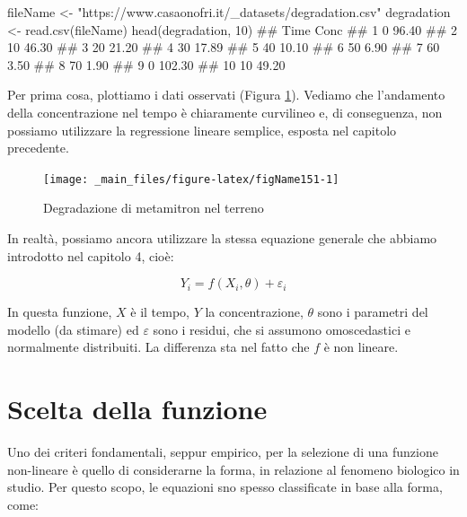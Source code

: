 \documentclass[a4paper,12pt,oneside]{book}
\newenvironment{Shaded}{\begin{snugshade}}{\end{snugshade}}
\newcommand{\DecValTok}[1]{#1}
\newcommand{\StringTok}[1]{#1}
\newcommand{\DocumentationTok}[1]{#1}
\newcommand{\OtherTok}[1]{#1}
\newcommand{\FunctionTok}[1]{#1}
\newcommand{\NormalTok}[1]{#1}
\begin{document}
\begin{Shaded}
\begin{Highlighting}[]
\NormalTok{fileName }\OtherTok{\textless{}{-}} \StringTok{"https://www.casaonofri.it/\_datasets/degradation.csv"}
\NormalTok{degradation }\OtherTok{\textless{}{-}} \FunctionTok{read.csv}\NormalTok{(fileName)}
\FunctionTok{head}\NormalTok{(degradation, }\DecValTok{10}\NormalTok{)}
\DocumentationTok{\#\#    Time   Conc}
\DocumentationTok{\#\# 1     0  96.40}
\DocumentationTok{\#\# 2    10  46.30}
\DocumentationTok{\#\# 3    20  21.20}
\DocumentationTok{\#\# 4    30  17.89}
\DocumentationTok{\#\# 5    40  10.10}
\DocumentationTok{\#\# 6    50   6.90}
\DocumentationTok{\#\# 7    60   3.50}
\DocumentationTok{\#\# 8    70   1.90}
\DocumentationTok{\#\# 9     0 102.30}
\DocumentationTok{\#\# 10   10  49.20}
\end{Highlighting}
\end{Shaded}

Per prima cosa, plottiamo i dati osservati (Figura \ref{fig:figName151}). Vediamo che l'andamento della concentrazione nel tempo è chiaramente curvilineo e, di conseguenza, non possiamo utilizzare la regressione lineare semplice, esposta nel capitolo precedente.

\begin{figure}

{\centering \texttt{[image: \_main\_files/figure-latex/figName151-1]} 

}

\caption{Degradazione di metamitron nel terreno}\label{fig:figName151}
\end{figure}

In realtà, possiamo ancora utilizzare la stessa equazione generale che abbiamo introdotto nel capitolo 4, cioè:

\[ Y_i = f(X_i, \theta) + \varepsilon_i \]

In questa funzione, \(X\) è il tempo, \(Y\) la concentrazione, \(\theta\) sono i parametri del modello (da stimare) ed \(\varepsilon\) sono i residui, che si assumono omoscedastici e normalmente distribuiti. La differenza sta nel fatto che \(f\) è non lineare.

\hypertarget{scelta-della-funzione}{%
\section{Scelta della funzione}\label{scelta-della-funzione}}

Uno dei criteri fondamentali, seppur empirico, per la selezione di una funzione non-lineare è quello di considerarne la forma, in relazione al fenomeno biologico in studio. Per questo scopo, le equazioni sno spesso classificate in base alla forma, come:
\end{document}
